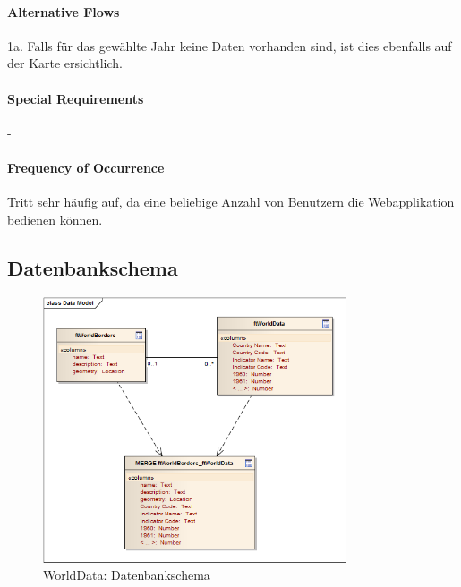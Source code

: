 \paragraph{Alternative Flows}
1a. Falls für das gewählte Jahr keine Daten vorhanden sind, ist dies ebenfalls auf der Karte ersichtlich.

\paragraph{Special Requirements}
-

\paragraph{Frequency of Occurrence}
Tritt sehr häufig auf, da eine beliebige Anzahl von Benutzern die Webapplikation bedienen können.

\subsection{Datenbankschema}
\begin{figure}[H]
	\centering
	\includegraphics[width=0.8\textwidth]{images/usecase1-worlddata/uml/worlddata-datamodel}
	\caption{WorldData: Datenbankschema}
	\label{worlddata-datamodel}
\end{figure}


